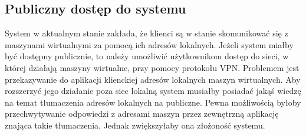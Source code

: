 \documentclass[../podsumowanie.tex]{subfiles}
\begin{document}
\subsection{Publiczny dostęp do systemu}

System w aktualnym stanie zakłada, że klienci są w stanie skomunikować się z maszynami wirtualnymi za pomocą ich adresów lokalnych.
Jeżeli system miałby być dostępny publicznie, to należy umożliwić użytkownikom dostęp do sieci, w której działają maszyny wirtualne, przy pomocy protokołu VPN.
Problemem jest przekazywanie do aplikacji klienckiej adresów lokalnych maszyn wirtualnych.
Aby rozszerzyć jego działanie poza siec lokalną  system musiałby posiadać jakąś wiedzę na temat tłumaczenia adresów lokalnych na publiczne.
Pewna możliwością byłoby przechwytywanie odpowiedzi z adresami maszyn przez zewnętrzną aplikację znająca takie tłumaczenia.
Jednak zwiększyłaby ona złożoność systemu.
\end{document}
